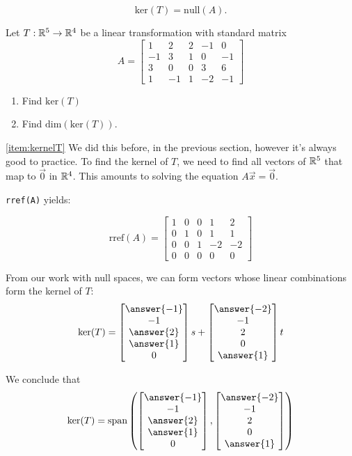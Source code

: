 \documentclass{ximera}
\begin{document}
$$\mbox{ker}(T)=\mbox{null}(A).$$
 
\begin{example}\label{ex:kernel} Let $T:\mathbb{R}^5\rightarrow \mathbb{R}^4$ be a linear transformation with standard matrix $$A=\begin{bmatrix}1 & 2 & 2 &-1 & 0\\-1 & 3 & 1 & 0 & -1\\3 & 0 & 0 & 3 & 6\\ 1 & -1 & 1 & -2 & -1\end{bmatrix}$$
\begin{enumerate}
\item \label{item:kernelT}
Find $\mbox{ker}(T)$
\item \label{item:dimkernelT}
Find $\mbox{dim}(\mbox{ker}(T))$.
\end{enumerate}
\begin{explanation}

\ref{item:kernelT} We did this before, in the previous section, however it's always good to practice. To find the kernel of $T$, we need to find all vectors of $\mathbb{R}^5$ that map to $\vec{0}$ in $\mathbb{R}^4$.  This amounts to solving the equation $A\vec{x}=\vec{0}$.
 
\texttt{rref(A)} yields:
 
$$\mbox{rref}(A)= \begin{bmatrix} 1 & 0 & 0 & 1 & 2\\0 & 1 & 0 & 1 & 1\\0 & 0 & 1 & -2 & -2\\ 0 & 0 & 0 & 0 & 0 \end{bmatrix}$$
 
From our work with null spaces, we can form vectors whose linear combinations form the kernel of $T$:
$$\mbox{ker}(T)=\begin{bmatrix}\answer{-1}\\-1\\\answer{2}\\\answer{1}\\0\end{bmatrix}s+\begin{bmatrix}\answer{-2}\\-1\\2\\0\\\answer{1}\end{bmatrix}t$$
 
We conclude that
$$\mbox{ker}(T)=\mbox{span}\left(\begin{bmatrix}\answer{-1}\\-1\\\answer{2}\\\answer{1}\\0\end{bmatrix},\begin{bmatrix}\answer{-2}\\-1\\2\\0\\\answer{1}\end{bmatrix}\right)$$
 

\end{explanation}
\end{example}
\end{document}

